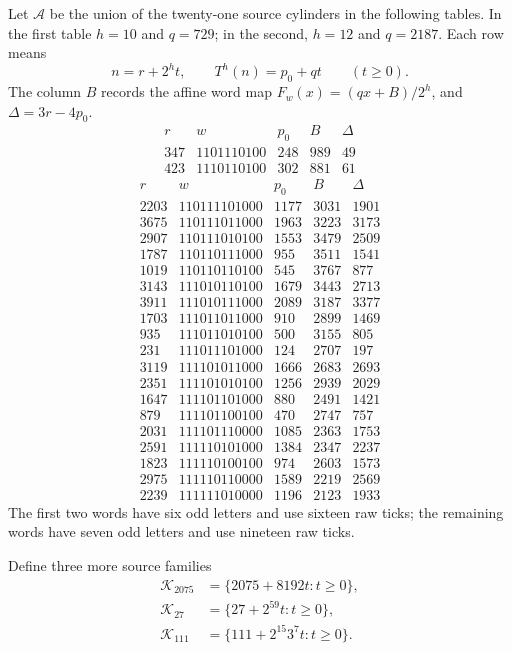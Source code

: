 \documentclass[11pt,letterpaper]{article}
\begin{document}
Let \(\mathcal A\) be the union of the twenty-one source cylinders in the
following tables. In the first table \(h=10\) and \(q=729\); in the second,
\(h=12\) and \(q=2187\). Each row means
\[
n=r+2^ht,\qquad T^h(n)=p_0+qt\qquad(t\ge0).
\]
The column \(B\) records the affine word map
\(F_w(x)=(qx+B)/2^h\), and \(\Delta=3r-4p_0\).
\[
\begin{array}{r|c|r|r|r}
r&w&p_0&B&\Delta\\ \hline
347&1101110100&248&989&49\\
423&1110110100&302&881&61
\end{array}
\]
\[
\begin{array}{r|c|r|r|r}
r&w&p_0&B&\Delta\\ \hline
2203&110111101000&1177&3031&1901\\
3675&110111011000&1963&3223&3173\\
2907&110111010100&1553&3479&2509\\
1787&110110111000&955&3511&1541\\
1019&110110110100&545&3767&877\\
3143&111010110100&1679&3443&2713\\
3911&111010111000&2089&3187&3377\\
1703&111011011000&910&2899&1469\\
935&111011010100&500&3155&805\\
231&111011101000&124&2707&197\\
3119&111101011000&1666&2683&2693\\
2351&111101010100&1256&2939&2029\\
1647&111101101000&880&2491&1421\\
879&111101100100&470&2747&757\\
2031&111101110000&1085&2363&1753\\
2591&111110101000&1384&2347&2237\\
1823&111110100100&974&2603&1573\\
2975&111110110000&1589&2219&2569\\
2239&111111010000&1196&2123&1933
\end{array}
\]
The first two words have six odd letters and use sixteen raw ticks; the
remaining words have seven odd letters and use nineteen raw ticks.

Define three more source families
\[
\begin{aligned}
\mathcal K_{2075}&=\{2075+8192t:t\ge0\},\\
\mathcal K_{27}&=\{27+2^{59}t:t\ge0\},\\
\mathcal K_{111}&=\{111+2^{15}3^7t:t\ge0\}.
\end{aligned}
\]
\end{document}

